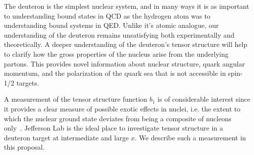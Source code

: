 The deuteron is the simplest nuclear system, and in many ways it is as important to understanding bound states in QCD as the hydrogen atom was to understanding bound systems in QED.  Unlike it's atomic analogue, our understanding of the deuteron remains unsatisfying both experimentally and theoretically.  
A deeper understanding of the deuteron's tensor structure will help to clarify how the gross properties of the nucleus arise from the 
underlying partons.  This provides novel information about
nuclear structure, quark angular momentum, and the polarization of the quark sea  that is not accessible in spin-1/2 targets.  


A measurement of the tensor structure function $b_1$ is of considerable interest since it provides a clear measure of possible exotic effects in nuclei, i.e. the extent to which the nuclear ground state deviates from being a composite of nucleons only~\cite{Khan:1991qk}.
Jefferson Lab is the ideal place to investigate 
tensor structure in a deuteron target 
at intermediate and large $x$.  We describe such a measurement in this proposal.
